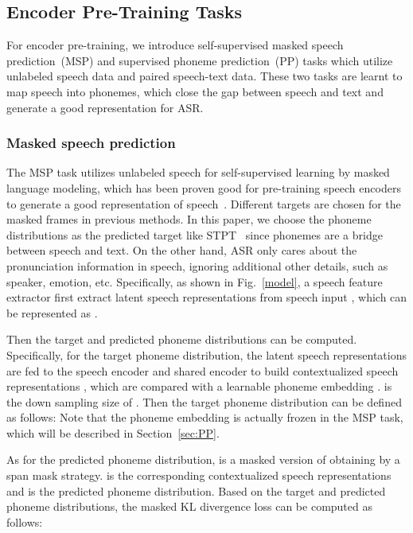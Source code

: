 \documentclass{article}
\begin{document}
\subsection{Encoder Pre-Training Tasks}
For encoder pre-training, we introduce self-supervised masked speech prediction~(MSP) and supervised phoneme prediction~(PP) tasks which utilize unlabeled speech data and paired speech-text data. These two tasks are learnt to map speech into phonemes, which close the gap between speech and text and generate a good representation for ASR.



\subsubsection{Masked speech prediction}
\label{sec:MSP}
The MSP task utilizes unlabeled speech for self-supervised learning by masked language modeling, which has been proven good for pre-training speech encoders to generate a good representation of speech~\cite{baevski2020wav2vec,hsu2021hubert,baevski2022data2vec,tang2022unified}. Different targets are chosen for the masked frames in previous methods. In this paper, we choose the phoneme distributions as the predicted target like STPT~\cite{tang2022unified} since phonemes are a bridge between speech and text. On the other hand, ASR only cares about the pronunciation information in speech, ignoring additional other details, such as speaker, emotion, etc.
Specifically, as shown in Fig.~\ref{model}, a speech feature extractor first extract latent speech representations from speech input , which can be represented as .

Then the target and predicted phoneme distributions can be computed. Specifically, for the target phoneme distribution, the latent speech representations  are fed to the speech encoder and shared encoder to build contextualized speech representations , which are compared with a learnable phoneme embedding .  is the down sampling size of . Then the target phoneme distribution  can be defined as follows: 
Note that the phoneme embedding  is actually frozen in the MSP task, which will be described in Section~\ref{sec:PP}. 

As for the predicted phoneme distribution,  is a masked version of  obtaining by a span mask strategy\cite{baevski2022data2vec}.  is the corresponding contextualized speech representations and  is the predicted phoneme distribution. Based on the target and predicted phoneme distributions, the masked KL divergence loss can be computed as follows:
\end{document}

